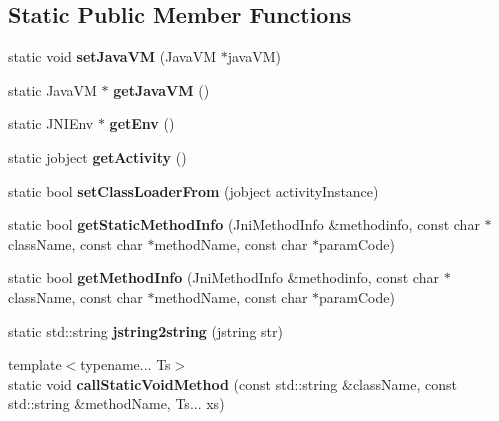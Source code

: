 \subsection*{Static Public Member Functions}
\begin{DoxyCompactItemize}
\item 
\mbox{\label{classJniHelper_ac0648dcc61b25777ecf25e1d74c0efc4}} 
static void {\bfseries set\+Java\+VM} (Java\+VM $\ast$java\+VM)
\item 
\mbox{\label{classJniHelper_a7f86412296b664016818ab2c408c8ac7}} 
static Java\+VM $\ast$ {\bfseries get\+Java\+VM} ()
\item 
\mbox{\label{classJniHelper_a471d6ccc2029cb5324d64fb8f1560b9c}} 
static J\+N\+I\+Env $\ast$ {\bfseries get\+Env} ()
\item 
\mbox{\label{classJniHelper_a8bf413b5ffc5b80157ecc4f1b21395dc}} 
static jobject {\bfseries get\+Activity} ()
\item 
\mbox{\label{classJniHelper_ad07a0bb1795f223f149ba165ee61d724}} 
static bool {\bfseries set\+Class\+Loader\+From} (jobject activity\+Instance)
\item 
\mbox{\label{classJniHelper_a9be9fb9b7e5a757cb8d0e40c51614129}} 
static bool {\bfseries get\+Static\+Method\+Info} (Jni\+Method\+Info \&methodinfo, const char $\ast$class\+Name, const char $\ast$method\+Name, const char $\ast$param\+Code)
\item 
\mbox{\label{classJniHelper_accfc6d9459e6e6a14a82ba429032f27c}} 
static bool {\bfseries get\+Method\+Info} (Jni\+Method\+Info \&methodinfo, const char $\ast$class\+Name, const char $\ast$method\+Name, const char $\ast$param\+Code)
\item 
\mbox{\label{classJniHelper_a702f700e9f03c67efd12ea316b0a203e}} 
static std\+::string {\bfseries jstring2string} (jstring str)
\item 
\mbox{\label{classJniHelper_a150e8688e93959e9e7baec5ef231af93}} 
{\footnotesize template$<$typename... Ts$>$ }\\static void {\bfseries call\+Static\+Void\+Method} (const std\+::string \&class\+Name, const std\+::string \&method\+Name, Ts... xs)

\end{DoxyCompactItemize}
